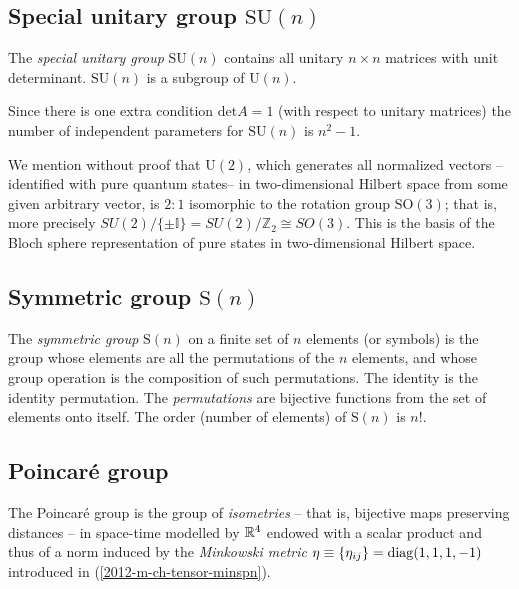 \subsection{Special unitary group $\textrm{SU}(n)$}

The {\em special unitary group} $\textrm{SU}(n)$
contains all  unitary
$n\times n$ matrices with unit determinant.
$\textrm{SU}(n)$ is a subgroup of $\textrm{U}(n)$.

Since there is one extra condition  $\textrm{det} A =1$
(with respect to unitary matrices)
the number of independent parameters for $\textrm{SU}(n)$ is  $n^2-1$.

We mention without proof that $\textrm{U}(2)$, which generates all normalized vectors -- identified with pure quantum states--
in two-dimensional
Hilbert space from some given arbitrary vector, is $2:1$ isomorphic to the rotation group $\textrm{SO}(3)$;
that is, more precisely $SU(2)/\{ \pm \mathbb{I}\} = SU(2)/\mathbb{Z}_2\cong SO(3)$.
This is the basis of the Bloch sphere representation of pure states in two-dimensional Hilbert space.

\subsection{Symmetric group $\textrm{S}(n)$}

The {\em symmetric group}
  $\textrm{S}(n)$ on a finite set of $n$ elements (or symbols)
is the group whose elements are all the permutations of the $n$ elements,
and whose group operation is the composition of such permutations.
The identity is the identity permutation.
The {\em permutations} are bijective functions from the set of elements onto itself.
The order (number of elements) of $\textrm{S}(n)$ is $n!$.



\subsection{Poincar\'e group}


The {Poincar\'e group} is the group of {\em isometries}
--
that is,
bijective maps preserving distances
--
in space-time modelled by ${\Bbb R}^4$
endowed with a scalar product and thus
of a norm induced by the
{\em Minkowski metric}
$
\eta \equiv \{\eta_{ij}\}={\rm diag} (1,1,1,-1)
$
introduced in (\ref{2012-m-ch-tensor-minspn}).

